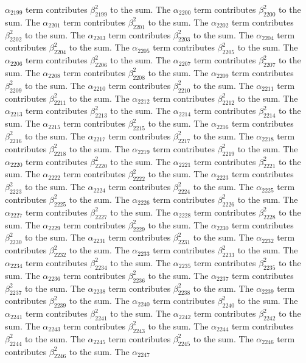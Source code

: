 \begin{lemma}
$\alpha_{2199}$ term contributes $\beta_{2199}^{2}$ to the sum. The $\alpha_{2200}$ term contributes $\beta_{2200}^{2}$ to the sum. The $\alpha_{2201}$ term contributes $\beta_{2201}^{2}$ to the sum. The $\alpha_{2202}$ term contributes $\beta_{2202}^{2}$ to the sum. The $\alpha_{2203}$ term contributes $\beta_{2203}^{2}$ to the sum. The $\alpha_{2204}$ term contributes $\beta_{2204}^{2}$ to the sum. The $\alpha_{2205}$ term contributes $\beta_{2205}^{2}$ to the sum. The $\alpha_{2206}$ term contributes $\beta_{2206}^{2}$ to the sum. The $\alpha_{2207}$ term contributes $\beta_{2207}^{2}$ to the sum. The $\alpha_{2208}$ term contributes $\beta_{2208}^{2}$ to the sum. The $\alpha_{2209}$ term contributes $\beta_{2209}^{2}$ to the sum. The $\alpha_{2210}$ term contributes $\beta_{2210}^{2}$ to the sum. The $\alpha_{2211}$ term contributes $\beta_{2211}^{2}$ to the sum. The $\alpha_{2212}$ term contributes $\beta_{2212}^{2}$ to the sum. The $\alpha_{2213}$ term contributes $\beta_{2213}^{2}$ to the sum. The $\alpha_{2214}$ term contributes $\beta_{2214}^{2}$ to the sum. The $\alpha_{2215}$ term contributes $\beta_{2215}^{2}$ to the sum. The $\alpha_{2216}$ term contributes $\beta_{2216}^{2}$ to the sum. The $\alpha_{2217}$ term contributes $\beta_{2217}^{2}$ to the sum. The $\alpha_{2218}$ term contributes $\beta_{2218}^{2}$ to the sum. The $\alpha_{2219}$ term contributes $\beta_{2219}^{2}$ to the sum. The $\alpha_{2220}$ term contributes $\beta_{2220}^{2}$ to the sum. The $\alpha_{2221}$ term contributes $\beta_{2221}^{2}$ to the sum. The $\alpha_{2222}$ term contributes $\beta_{2222}^{2}$ to the sum. The $\alpha_{2223}$ term contributes $\beta_{2223}^{2}$ to the sum. The $\alpha_{2224}$ term contributes $\beta_{2224}^{2}$ to the sum. The $\alpha_{2225}$ term contributes $\beta_{2225}^{2}$ to the sum. The $\alpha_{2226}$ term contributes $\beta_{2226}^{2}$ to the sum. The $\alpha_{2227}$ term contributes $\beta_{2227}^{2}$ to the sum. The $\alpha_{2228}$ term contributes $\beta_{2228}^{2}$ to the sum. The $\alpha_{2229}$ term contributes $\beta_{2229}^{2}$ to the sum. The $\alpha_{2230}$ term contributes $\beta_{2230}^{2}$ to the sum. The $\alpha_{2231}$ term contributes $\beta_{2231}^{2}$ to the sum. The $\alpha_{2232}$ term contributes $\beta_{2232}^{2}$ to the sum. The $\alpha_{2233}$ term contributes $\beta_{2233}^{2}$ to the sum. The $\alpha_{2234}$ term contributes $\beta_{2234}^{2}$ to the sum. The $\alpha_{2235}$ term contributes $\beta_{2235}^{2}$ to the sum. The $\alpha_{2236}$ term contributes $\beta_{2236}^{2}$ to the sum. The $\alpha_{2237}$ term contributes $\beta_{2237}^{2}$ to the sum. The $\alpha_{2238}$ term contributes $\beta_{2238}^{2}$ to the sum. The $\alpha_{2239}$ term contributes $\beta_{2239}^{2}$ to the sum. The $\alpha_{2240}$ term contributes $\beta_{2240}^{2}$ to the sum. The $\alpha_{2241}$ term contributes $\beta_{2241}^{2}$ to the sum. The $\alpha_{2242}$ term contributes $\beta_{2242}^{2}$ to the sum. The $\alpha_{2243}$ term contributes $\beta_{2243}^{2}$ to the sum. The $\alpha_{2244}$ term contributes $\beta_{2244}^{2}$ to the sum. The $\alpha_{2245}$ term contributes $\beta_{2245}^{2}$ to the sum. The $\alpha_{2246}$ term contributes $\beta_{2246}^{2}$ to the sum. The $\alpha_{2247}$ 
\end{lemma}
